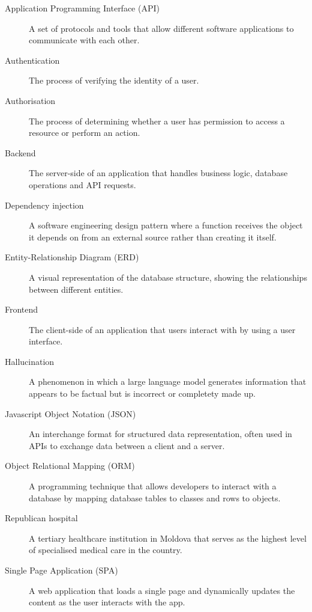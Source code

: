 \begin{description}
    \item[Application Programming Interface (API)] A set of protocols and tools that allow different software applications to communicate with each other.
    \item[Authentication] The process of verifying the identity of a user.
    \item[Authorisation] The process of determining whether a user has permission to access a resource or perform an action.  
    \item[Backend] The server-side of an application that handles business logic, database operations and API requests.
    \item[Dependency injection] A software engineering design pattern where a function receives the object it depends on from an external source rather than creating it itself.
    \item[Entity-Relationship Diagram (ERD)] A visual representation of the database structure, showing the relationships between different entities.
    \item[Frontend] The client-side of an application that users interact with by using a user interface. 
    \item[Hallucination] A phenomenon in which a large language model generates information that appears to be factual but is incorrect or completety made up.
    \item[Javascript Object Notation (JSON)] An interchange format for structured data representation, often used in APIs to exchange data between a client and a server.
    \item[Object Relational Mapping (ORM)] A programming technique that allows developers to interact with a database by mapping database tables to classes and rows to objects.
    \item[Republican hospital] A tertiary healthcare institution in Moldova that serves as the highest level of specialised medical care in the country.
    \item[Single Page Application (SPA)] A web application that loads a single page and dynamically updates the content as the user interacts with the app.
\end{description}